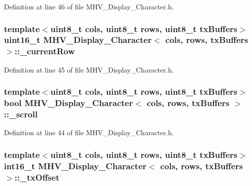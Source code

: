 Definition at line 46 of file M\-H\-V\-\_\-\-Display\-\_\-\-Character.\-h.

\hypertarget{class_m_h_v___display___character_a69ba315c51c4f3f2795709c79e02856f}{
\subsubsection[{\-\_\-current\-Row}]{\setlength{\rightskip}{0pt plus 5cm}template$<$uint8\-\_\-t cols, uint8\-\_\-t rows, uint8\-\_\-t tx\-Buffers$>$ uint16\-\_\-t {\bf M\-H\-V\-\_\-\-Display\-\_\-\-Character}$<$ cols, rows, tx\-Buffers $>$\-::\-\_\-current\-Row\hspace{0.3cm}{\ttfamily [protected]}}}\label{class_m_h_v___display___character_a69ba315c51c4f3f2795709c79e02856f}


Definition at line 45 of file M\-H\-V\-\_\-\-Display\-\_\-\-Character.\-h.

\hypertarget{class_m_h_v___display___character_a18c24ac662d632a75c83fb9940b7d876}{
\subsubsection[{\-\_\-scroll}]{\setlength{\rightskip}{0pt plus 5cm}template$<$uint8\-\_\-t cols, uint8\-\_\-t rows, uint8\-\_\-t tx\-Buffers$>$ bool {\bf M\-H\-V\-\_\-\-Display\-\_\-\-Character}$<$ cols, rows, tx\-Buffers $>$\-::\-\_\-scroll\hspace{0.3cm}{\ttfamily [protected]}}}\label{class_m_h_v___display___character_a18c24ac662d632a75c83fb9940b7d876}


Definition at line 44 of file M\-H\-V\-\_\-\-Display\-\_\-\-Character.\-h.

\hypertarget{class_m_h_v___display___character_ae32f200ae564067a82869ac47409d7b6}{
\subsubsection[{\-\_\-tx\-Offset}]{\setlength{\rightskip}{0pt plus 5cm}template$<$uint8\-\_\-t cols, uint8\-\_\-t rows, uint8\-\_\-t tx\-Buffers$>$ int16\-\_\-t {\bf M\-H\-V\-\_\-\-Display\-\_\-\-Character}$<$ cols, rows, tx\-Buffers $>$\-::\-\_\-tx\-Offset\hspace{0.3cm}{\ttfamily [protected]}}}\label{class_m_h_v___display___character_ae32f200ae564067a82869ac47409d7b6}


